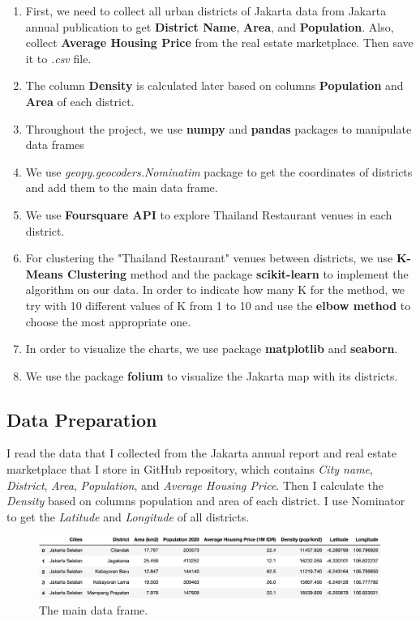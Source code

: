 \documentclass[12pt,a4paper]{article}
\begin{document}
\begin{enumerate}
\item First, we need to collect all urban districts of Jakarta data from Jakarta annual publication to get \textbf{District Name}, \textbf{Area}, and \textbf{Population}. Also, collect \textbf{Average Housing Price} from the real estate marketplace. Then save it to \textit{.csv} file.
\item The column \textbf{Density} is calculated later based on columns \textbf{Population} and \textbf{Area} of each district.
\item Throughout the project, we use \textbf{numpy} and \textbf{pandas} packages to manipulate data frames
\item We use \textit{geopy.geocoders.Nominatim} package to get the coordinates of districts and add them to the main data frame.
\item We use \textbf{Foursquare API} to explore Thailand Restaurant venues in each district.
\item For clustering the "Thailand Restaurant" venues between districts, we use \textbf{K-Means Clustering} method and the package \textbf{scikit-learn} to implement the algorithm on our data. In order to indicate how many K for the method, we try with 10 different values of K from 1 to 10 and use the \textbf{elbow method} to choose the most appropriate one.
\item In order to visualize the charts, we use package \textbf{matplotlib} and \textbf{seaborn}.
\item We use the package \textbf{folium} to visualize the Jakarta map with its districts.
\end{enumerate}

\subsection{Data Preparation}
I read the data that I collected from the Jakarta annual report and real estate marketplace that I store in GitHub repository, which contains \textit{City name}, \textit{District}, \textit{Area}, \textit{Population}, and \textit{Average Housing Price}. Then I calculate the \textit{Density} based on columns population and area of each district. I use Nominator to get the \textit{Latitude} and \textit{Longitude} of all districts.

\begin{center}
    \begin{figure}[htp]
    \begin{center}
     \includegraphics[width=\textwidth]{fig/df}
    \end{center}
    \caption{The main data frame.}
    \label{fig:df}
    \end{figure}
\end{center}
\end{document}
